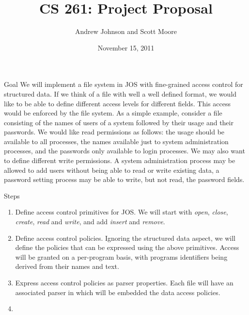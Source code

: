 \documentclass[10pt]{article}
\begin{document}
\title{CS 261: Project Proposal}
\author{Andrew Johnson and Scott Moore}
\date{November 15, 2011}

\maketitle

\thispagestyle{empty}

\begin{comment}

\begin{problem}{Problem Title}
Problem Statement
\newline\newline
\textbf{\emph{Solution}}:
\newline\newline
Solution goes here
\end{problem}

\end{comment}

\begin{section}{Goal}
We will implement a file system in JOS with fine-grained access control for structured data.  
If we think of a file with well a well defined format, we would like to be able to define different access levels for different fields.  
This access would be enforced by the file system.  
As a simple example, consider a file consisting of the names of users of a system followed by their usage and their passwords.  
We would like read permissions as follows: the usage should be available to all processes, the names available just to system administration processes, and the passwords only available to login processes. 
We may also want to define different write permissions.  
A system administration process may be allowed to add users without being able to read or write existing data, a password setting process may be able to write, but not read, the password fields.
\end{section}
\begin{section}{Steps}
\begin{enumerate}
\item Define access control primitives for JOS.  
We will start with \emph{open}, \emph{close}, \emph{create}, \emph{read} and \emph{write}, and add \emph{insert} and \emph{remove}.
\item Define access control policies.  
Ignoring the structured data aspect, we will define the policies that can be expressed using the above primitives.  
Access will be granted on a per-program basis, with programs identifiers being derived from their names and text.
\item Express access control policies as parser properties.  
Each file will have an associated parser in which will be embedded the data access policies.
\item 
\end{enumerate}
\end{section}
\end{document}
